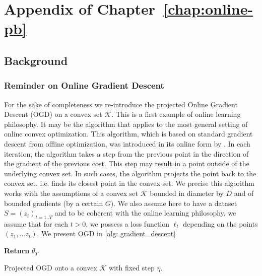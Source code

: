 \chapter{Appendix of Chapter~\ref{chap:online-pb}}
\label{ap: online-pb}



\section{Background}

\subsection{Reminder on Online Gradient Descent }
\label{sec: OGD_reminder}

For the sake of completeness we re-introduce the projected Online Gradient Descent (OGD) on a convex set $\mathcal{K}$. This is a first example of online learning philosophy. It may be the algorithm that applies to the most general setting
of online convex optimization. This algorithm,
which is based on standard gradient descent from offline optimization, was
introduced in its online form by \cite{zinkevich2003online}.
In each iteration, the algorithm takes a step from the previous point in
the direction of the gradient of the previous cost. This step may result in
a point outside of the underlying convex set. In such cases, the algorithm
projects the point back to the convex set, i.e. finds its closest point in the
convex set. We precise this algorithm works with the assumptions of a convex set $\mathcal{K}$ bounded in diameter by $D$ and of bounded gradients (by a certain $G$).
We also assume here to have a dataset $S=(z_t)_{t=1..T}$ and to be coherent with the online learning philosophy, we assume that for each $t>0$, we possess a loss function $\ell_t$ depending on the points $(z_1,...z_t)$. We present OGD in \cref{alg: gradient_descent}


\begin{algorithm}[ht]
 \SetAlgoLined
\textbf{Return} $\theta_{T}$
 \caption{Projected OGD onto a convex $\mathcal{K}$ with fixed step $\eta$.}
 \label{alg: gradient_descent}
 \end{algorithm}

